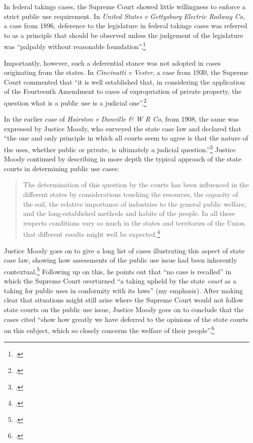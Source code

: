In federal takings cases, the Supreme Court showed little willingness to enforce a strict public use requirement. In {\it United States v Gettysburg Electric Railway Co}, a case from 1896, deference to the legislature in federal takings cases was referred to as a principle that should be observed unless the judgement of the legislature was ``palpably without reasonable foundation''.\footcite[680]{gettysburg96} 

Importantly, however, such a deferential stance was not adopted in cases originating from the states. In {\it Cincinatti v Vester}, a case from 1930, the Supreme Court commented that ``it is well established that, in considering the application of the Fourteenth Amendment to cases of expropriation of private property, the question what is a public use is a judicial one''.\footcite[447]{vester30}

In the earlier case of {\it Hairston v Danville \& W R Co}, from 1908, the same was expressed by Justice Moody, who surveyed the state case law and declared that ``the one and only principle in which all courts seem to agree is that the nature of the uses, whether public or private, is ultimately a judicial question.''\footcite[606]{hairston08} Justice Moody continued by describing in more depth the typical approach of the state courts in determining public use cases:

\begin{quote}
The determination of this question by the courts has been influenced in the different states by considerations touching the resources, the capacity of the soil, the relative importance of industries to the general public welfare, and the long-established methods and habits of the people. In all these respects conditions vary so much in the states and territories of the Union that different results might well be expected.\footcite[606]{hairston08}
\end{quote}

Justice Moody goes on to give a long list of cases illustrating this aspect of state case law, showing how assessments of the public use issue had been inherently contextual.\footcite[607]{hairston08} Following up on this, he points out that ``no case is recalled'' in which the Supreme Court overturned ``a taking upheld by the state {\it court} as a taking for public uses in conformity with its laws'' (my emphasis). After making clear that situations might still arise where the Supreme Court would not follow state courts on the public use issue, Justice Moody goes on to conclude that the cases cited ``show how greatly we have deferred to the opinions of the state courts on this subject, which so closely concerns the welfare of their people''.\footcite[606]{hairston08}

